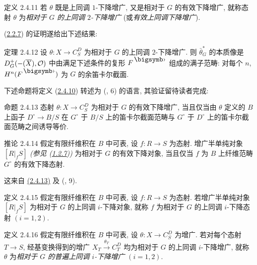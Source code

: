 \begin{enonce*}{定义 2.4.11}
若 $\theta$ 既是上同调 $1$-下降增广,
又是相对于 $G$ 的有效下降增广,
就称态射 $\theta$ 为\emph{相对于 $G$ 的上同调 $2$-下降增广}
(或\emph{有效上同调下降增广}).
\end{enonce*}

(\hyperref[Vbis.prop2.2.7]{2.2.7}) 的证明遂给出下述结果:

\begin{enonce*}{定理 2.4.12}
设\pageoriginale{} $\theta:X\to C^D_S$ 为相对于 $G$ 的上同调 $2$-下降增广.
则 $\bar\theta_G^{\ast}$ 的本质像是
$D_G^+(\Ysheaf{\Gamma}(\bar X),\mathcal O)$ 中由满足下述条件的复形 $F^{\bigdot}$ 组成的满子范畴:
对每个 $n$, $H^n(F^{\bigdot})$ 为 $G$ 的余笛卡尔截面.
\end{enonce*}

下述命题将定义 (\hyperref[Vbis.def2.4.10]{2.4.10})
转述为 (\cite{sga4.exp.Vbis.bib.4}, 6) 的语言, 其验证留待读者完成:

\begin{enonce*}{命题 2.4.13}
态射 $\theta:X\to C^D_S$ 为相对于 $G$ 的有效下降增广,
当且仅当由 $\theta$ 定义的 $B$ 上函子 $D^{\circ}\to B/S$
在 $G^{\circ}$ 于 $B/S$ 上的笛卡尔截面范畴与 $G^{\circ}$ 于 $D^{\circ}$ 上的笛卡尔截面范畴之间诱导等价.
\end{enonce*}

\begin{enonce*}{推论 2.4.14}
假定有限纤维积在 $B$ 中可表, 设 $f:R\to S$ 为态射.
增广半单纯对象 $[R|_fS]$ \emph{(参见 (\hyperref[Vbis.subsubsec1.2.7]{1.2.7}))}
为相对于 $G$ 的有效下降对象,
当且仅当 $f$ 为 $B$ 上纤维范畴 $G^{\circ}$ 的有效下降态射.
\end{enonce*}

这来自 \hyperref[Vbis.prop2.4.13]{(2.4.13)} 及 (\cite{sga4.exp.Vbis.bib.4}, 9).

\begin{enonce*}{定义 2.4.15}
假定有限纤维积在 $B$ 中可表, 设 $f:R\to S$ 为态射.
若增广半单纯对象 $[R|_fS]$ 为相对于 $G$ 的上同调 $i$-下降对象,
就称 $f$ 为相对于 $G$ 的上同调 $i$-下降态射 $(i=1,2)$.
\end{enonce*}

\begin{enonce*}{定义 2.4.16}
假定有限纤维积在 $B$ 中可表, 设 $\theta:X\to C^D_S$ 为增广.
若对每个态射 $T\to S$, 经基变换\pageoriginale{}得到的增广
$X_T\xrightarrow{\theta_T}C^D_T$ 均为相对于 $G$ 的上同调 $i$-下降增广,
就称 $\theta$ 为\emph{相对于 $G$ 的普遍上同调 $i$-下降增广 $(i=1,2)$}.
\end{enonce*}

